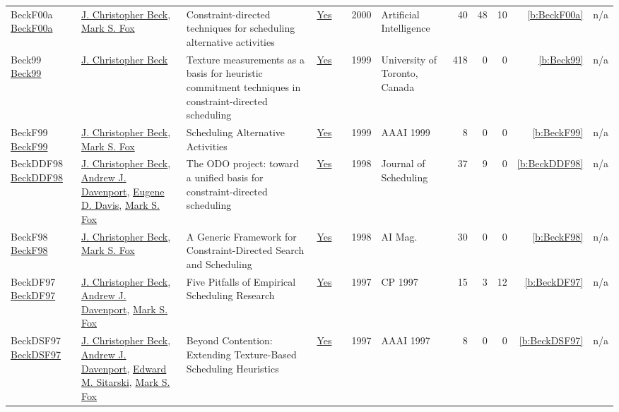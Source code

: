 {\begin{longtable}{>{\raggedright\arraybackslash}p{3cm}>{\raggedright\arraybackslash}p{6cm}>{\raggedright\arraybackslash}p{6.5cm}rrrp{2.5cm}rrrrr}
BeckF00a \href{http://dx.doi.org/10.1016/s0004-3702(00)00035-7}{BeckF00a} & \hyperref[auth:a89]{J. Christopher Beck}, \hyperref[auth:a304]{Mark S. Fox} & Constraint-directed techniques for scheduling alternative activities & \href{../works/BeckF00a.pdf}{Yes} & \cite{BeckF00a} & 2000 & Artificial Intelligence & 40 & 48 & 10 & \ref{b:BeckF00a} & n/a\\
Beck99 \href{https://librarysearch.library.utoronto.ca/permalink/01UTORONTO_INST/14bjeso/alma991106162342106196}{Beck99} & \hyperref[auth:a89]{J. Christopher Beck} & Texture measurements as a basis for heuristic commitment techniques in constraint-directed scheduling & \href{../works/Beck99.pdf}{Yes} & \cite{Beck99} & 1999 & University of Toronto, Canada & 418 & 0 & 0 & \ref{b:Beck99} & n/a\\
BeckF99 \href{http://www.aaai.org/Library/AAAI/1999/aaai99-097.php}{BeckF99} & \hyperref[auth:a89]{J. Christopher Beck}, \hyperref[auth:a304]{Mark S. Fox} & Scheduling Alternative Activities & \href{../works/BeckF99.pdf}{Yes} & \cite{BeckF99} & 1999 & AAAI 1999 & 8 & 0 & 0 & \ref{b:BeckF99} & n/a\\
BeckDDF98 \href{http://dx.doi.org/10.1002/(sici)1099-1425(199808)1:2<89::aid-jos9>3.0.co;2-h}{BeckDDF98} & \hyperref[auth:a89]{J. Christopher Beck}, \hyperref[auth:a250]{Andrew J. Davenport}, \hyperref[auth:a1238]{Eugene D. Davis}, \hyperref[auth:a304]{Mark S. Fox} & The ODO project: toward a unified basis for constraint-directed scheduling & \href{../works/BeckDDF98.pdf}{Yes} & \cite{BeckDDF98} & 1998 & Journal of Scheduling & 37 & 9 & 0 & \ref{b:BeckDDF98} & n/a\\
BeckF98 \href{https://doi.org/10.1609/aimag.v19i4.1426}{BeckF98} & \hyperref[auth:a89]{J. Christopher Beck}, \hyperref[auth:a304]{Mark S. Fox} & A Generic Framework for Constraint-Directed Search and Scheduling & \href{../works/BeckF98.pdf}{Yes} & \cite{BeckF98} & 1998 & {AI} Mag. & 30 & 0 & 0 & \ref{b:BeckF98} & n/a\\
BeckDF97 \href{https://doi.org/10.1007/BFb0017455}{BeckDF97} & \hyperref[auth:a89]{J. Christopher Beck}, \hyperref[auth:a250]{Andrew J. Davenport}, \hyperref[auth:a304]{Mark S. Fox} & Five Pitfalls of Empirical Scheduling Research & \href{../works/BeckDF97.pdf}{Yes} & \cite{BeckDF97} & 1997 & CP 1997 & 15 & 3 & 12 & \ref{b:BeckDF97} & n/a\\
BeckDSF97 \href{http://www.aaai.org/Library/AAAI/1997/aaai97-037.php}{BeckDSF97} & \hyperref[auth:a89]{J. Christopher Beck}, \hyperref[auth:a250]{Andrew J. Davenport}, \hyperref[auth:a1311]{Edward M. Sitarski}, \hyperref[auth:a304]{Mark S. Fox} & Beyond Contention: Extending Texture-Based Scheduling Heuristics & \href{../works/BeckDSF97.pdf}{Yes} & \cite{BeckDSF97} & 1997 & AAAI 1997 & 8 & 0 & 0 & \ref{b:BeckDSF97} & n/a\\

\end{longtable}}
